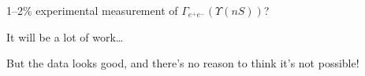 
\begin{slide*}

\slideframe{}
\huge
{}

\begin{minipage}[t]{\linewidth}
\huge

\vspace{1 cm}

1--2\% experimental measurement of $\Gamma_{e^+e^-}(\Upsilon(nS))$?

\vspace{1 cm}

It will be a lot of work\ldots

\vspace{1 cm}

But the data looks good, and there's no reason to think it's not
possible!

\end{minipage}

\end{slide*}










